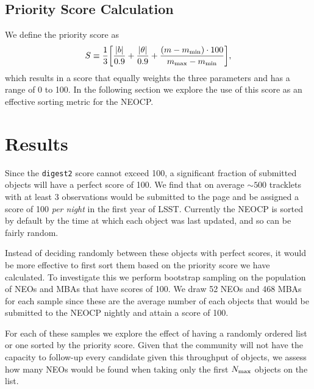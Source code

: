 \documentclass[twocolumn, twocolappendix]{aastex631}
\newcommand{\dig}{\texttt{digest2}}
\begin{document}
\subsection{Priority Score Calculation}
We define the priority score as
\begin{equation}
    S \equiv \frac{1}{3} \qty[\frac{|b|}{0.9} + \frac{|\theta|}{0.9} + \frac{(m - m_{\rm min}) \cdot 100}{m_{\rm max} - m_{\rm min}}],
\end{equation}
which results in a score that equally weights the three parameters and has a range of 0 to 100. In the following section we explore the use of this score as an effective sorting metric for the NEOCP.

\section{Results}

Since the \dig{} score cannot exceed 100, a significant fraction of submitted objects will have a perfect score of 100. We find that on average ${\sim}500$ tracklets with at least 3 observations would be submitted to the page and be assigned a score of 100 \emph{per night} in the first year of LSST. Currently the NEOCP is sorted by default by the time at which each object was last updated, and so can be fairly random.

Instead of deciding randomly between these objects with perfect scores, it would be more effective to first sort them based on the priority score we have calculated. To investigate this we perform bootstrap sampling on the population of NEOs and MBAs that have scores of 100. We draw 52 NEOs and 468 MBAs for each sample since these are the average number of each objects that would be submitted to the NEOCP nightly and attain a score of 100.

For each of these samples we explore the effect of having a randomly ordered list or one sorted by the priority score. Given that the community will not have the capacity to follow-up every candidate given this throughput of objects, we assess how many NEOs would be found when taking only the first $N_{\rm max}$ objects on the list.
\end{document}
